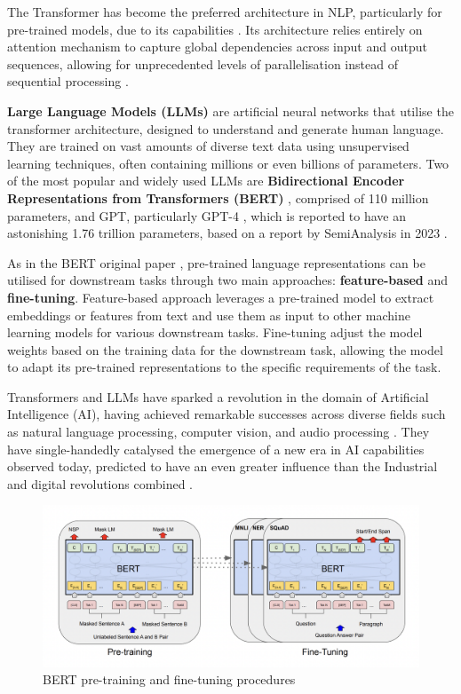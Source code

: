 The Transformer has become the preferred architecture in NLP, particularly for pre-trained models, due to its capabilities \cite{lin-2022-survey-transformers}. Its architecture relies entirely on attention mechanism to capture global dependencies across input and output sequences, allowing for unprecedented levels of parallelisation instead of sequential processing \cite{vaswani-2023-attention}.

\textbf{Large Language Models (LLMs)} are artificial neural networks that utilise the transformer architecture, designed to understand and generate human language. They are trained on vast amounts of diverse text data using unsupervised learning techniques, often containing millions or even billions of parameters. Two of the most popular and widely used LLMs are \textbf{Bidirectional Encoder Representations from Transformers (BERT)} \cite{devlin-2019-bert}, comprised of 110 million parameters, and GPT, particularly GPT-4 \cite{openai-2024-gpt4}, which is reported to have an astonishing 1.76 trillion parameters, based on a report by SemiAnalysis in 2023 \cite{semianalysis-gpt4}.

As in the BERT original paper \cite{devlin-2019-bert}, pre-trained language representations can be utilised for downstream tasks through two main approaches: \textbf{feature-based} and \textbf{fine-tuning}. Feature-based approach \cite{devlin-2019-bert} leverages a pre-trained model to extract embeddings or features from text and use them as input to other machine learning models for various downstream tasks. Fine-tuning \cite{devlin-2019-bert} adjust the model weights based on the training data for the downstream task, allowing the model to adapt its pre-trained representations to the specific requirements of the task.

Transformers and LLMs have sparked a revolution in the domain of Artificial Intelligence (AI), having achieved remarkable successes across diverse fields such as natural language processing, computer vision, and audio processing \cite{lin-2022-survey-transformers}. They have single-handedly catalysed the emergence of a new era in AI capabilities observed today, predicted to have an even greater influence than the Industrial and digital revolutions combined \cite{makridakis-2017-ai-revolution}.

\begin{figure}[htbp]
    \centering
    \includegraphics[width=0.9\linewidth]{images/bert_finetuning.png}
    \caption{BERT pre-training and fine-tuning procedures \cite{devlin-2019-bert}}
    \label{fig:bert_finetuning}
\end{figure}

